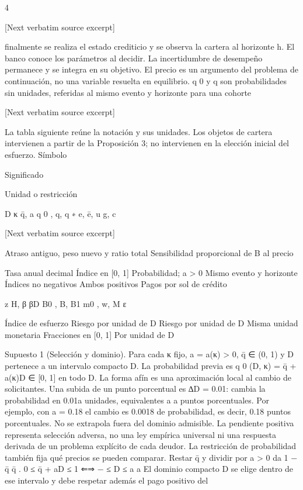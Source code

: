 \documentclass[10pt]{article}
\begin{document}
\begin{ReviewVerbatim}


4

[Next verbatim source excerpt]

ﬁnalmente se realiza el estado crediticio y se observa la cartera al horizonte h. El banco conoce los
parámetros al decidir. La incertidumbre de desempeño permanece y se integra en su objetivo. El
precio es un argumento del problema de continuación, no una variable resuelta en equilibrio.
q 0 y q son probabilidades sin unidades, referidas al mismo evento y horizonte para una cohorte

[Next verbatim source excerpt]

La tabla siguiente reúne la notación y sus unidades. Los objetos de cartera intervienen a partir
de la Proposición 3; no intervienen en la elección inicial del esfuerzo.
Símbolo

Signiﬁcado

Unidad o restricción

D
κ
q̄, a
q 0 , q, q ∗
e, ē, u
g, c

[Next verbatim source excerpt]

Atraso antiguo, peso nuevo y ratio total
Sensibilidad proporcional de B al precio

Tasa anual decimal
Índice en [0, 1]
Probabilidad; a > 0
Mismo evento y horizonte
Índices no negativos
Ambos positivos
Pagos por sol de crédito

z
H, β
βD
B0 , B, B1
m0 , w, M
ε

Índice de esfuerzo
Riesgo por unidad de D
Riesgo por unidad de D
Misma unidad monetaria
Fracciones en [0, 1]
Por unidad de D

Supuesto 1 (Selección y dominio). Para cada κ ﬁjo, a = a(κ) > 0, q̄ ∈ (0, 1) y D pertenece a un
intervalo compacto D. La probabilidad previa es q 0 (D, κ) = q̄ + a(κ)D ∈ [0, 1] en todo D.
La forma afín es una aproximación local al cambio de solicitantes. Una subida de un punto
porcentual es ∆D = 0.01: cambia la probabilidad en 0.01a unidades, equivalentes a a puntos porcentuales. Por ejemplo, con a = 0.18 el cambio es 0.0018 de probabilidad, es decir, 0.18 puntos
porcentuales. No se extrapola fuera del dominio admisible. La pendiente positiva representa selección adversa, no una ley empírica universal ni una respuesta derivada de un problema explícito de
cada deudor.
La restricción de probabilidad también ﬁja qué precios se pueden comparar. Restar q̄ y dividir
por a > 0 da
1 − q̄
q̄
.
0 ≤ q̄ + aD ≤ 1 ⇐⇒ − ≤ D ≤
a
a
El dominio compacto D se elige dentro de ese intervalo y debe respetar además el pago positivo del


\end{ReviewVerbatim}
\end{document}
